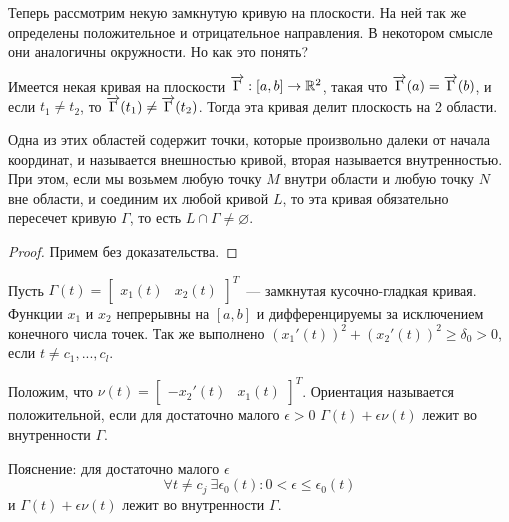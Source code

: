 \documentclass[main]{subfiles}
\begin{document}
Теперь рассмотрим некую замкнутую кривую на плоскости.
На ней так же определены положительное и отрицательное направления.
В некотором смысле они аналогичны окружности.
Но как это понять?

\begin{theorem}[Жордана]
    Имеется некая кривая на плоскости $\AnClOrCurve: [a, b] \to \R^2$, такая что $\AnClOrCurve(a) = \AnClOrCurve(b)$, и если $t_1 \neq t_2$, то $\AnClOrCurve(t_1) \neq \AnClOrCurve(t_2)$.
    Тогда эта кривая делит плоскость на 2 области.

    Одна из этих областей содержит точки, которые произвольно далеки от начала координат, и называется внешностью кривой, вторая называется внутренностью.
    При этом, если мы возьмем любую точку $M$ внутри области и любую точку $N$ вне области, и соединим их любой кривой $L$, то эта кривая обязательно пересечет кривую $\Gamma$, то есть $L \cap \Gamma \neq \varnothing$.
\end{theorem}
\begin{proof}
    Примем без доказательства.
\end{proof}

Пусть $\Gamma(t) =
    \begin{bmatrix}
        x_1(t) & x_2(t)
    \end{bmatrix}^T$~--- замкнутая кусочно-гладкая кривая.
Функции $x_1$ и $x_2$ непрерывны на $[a,b]$ и дифференцируемы за исключением конечного числа точек.
Так же выполнено $(x_1'(t))^2 + (x_2'(t))^2 \ge \delta_0 > 0$, если $t \neq c_1, ..., c_l$.

Положим, что $\nu(t) =
    \begin{bmatrix}
        -x_2'(t) & x_1(t)
    \end{bmatrix}^T$.
Ориентация называется положительной, если для достаточно малого $\epsilon >0$ $\Gamma(t) + \epsilon \nu (t)$ лежит во внутренности $\Gamma$.

Пояснение: для достаточно малого $\epsilon$
\[\forall t \neq c_j\ \exists \epsilon_0(t): 0 < \epsilon \le \epsilon_0(t)\]
и $\Gamma(t) + \epsilon \nu (t)$ лежит во внутренности $\Gamma$.
\end{document}

